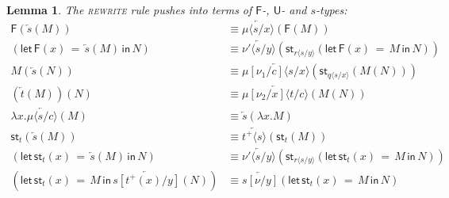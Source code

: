 \documentclass[10pt]{article}
\newtheorem{lemma}{Lemma}
\theoremstyle{definition}
\newcommand{\rewrite}[2]{\overleftarrow{#1}(#2)}
\newcommand\UE[2]{\ensuremath{#1(#2)}}
\newcommand\UI[2]{\ensuremath{\lambda #1.#2}}
\newcommand\StI[2]{\ensuremath{\mathsf{st}_{#1}(#2)}}
\newcommand\StE[4]{\ensuremath{\mathsf{let} \, \StI{#1}{#3} \, = \, {#2} \, \mathsf{in} \, #4}}
\newcommand\FE[3]{\ensuremath{\mathsf{let} \, \mathsf{F}(#2) \, = \, {#1} \, \mathsf{in} \, #3}}
\newcommand\FI[1]{\ensuremath{\mathsf{F}{(#1)}}}
\newcommand\TrPlus[2]{\ensuremath{{#1}^+(#2)}}
\newcommand\ap[2]{\ensuremath{#1 \langle #2 \rangle }}
\newcommand\ApPlus[2]{\ensuremath{{#1}^+ \langle #2 \rangle }}
\begin{document}
\begin{lemma} \label{lem:rewrite-push}
The \textsc{rewrite} rule pushes into terms of $\mathsf{F}$-, $\mathsf{U}$- and $s$-types:
\begin{align*}
\FI{\rewrite{s}{M}} &\equiv \rewrite{\ap{\mu}{s/x}}{\FI{M}} \\
(\FE{\rewrite{s}{M}}{x}{N}) &\equiv \rewrite{\ap{\nu'}{s/y}}{\StI{\ap{r}{s/y}}{\FE{M}{x}{N}}} \\
\UE{M}{\rewrite{s}{N}} &\equiv \rewrite{\ap{\mu[\nu_1/c]}{s/x}}{\StI{\ap{q}{s/x}}{\UE{M}{N}}} \\
\UE{(\rewrite{t}{M})}{N} &\equiv \rewrite{\ap{\mu[\nu_2/x]}{t/c}}{\UE{M}{N}} \\
\UI{x}{\rewrite{\ap{\mu}{s/c}}{M}}  &\equiv\rewrite{s}{\UI{x}{M}} \\
\StI{t}{\rewrite{s}{M}} &\equiv \rewrite{\ApPlus{t}{s}}{\StI{t}{M}} \\
(\StE{t}{\rewrite{s}{M}}{x}{N}) &\equiv \rewrite{\ap{\nu'}{s/y}}{\StI{\ap{r}{s/y}}{\StE{t}{M}{x}{N}}} \\
(\StE{t}{M}{x}{\rewrite{s[\TrPlus{t}{x}/y]}{N}}) &\equiv \rewrite{s[\nu/y]}{\StE{t}{M}{x}{N}} 
\end{align*}
\end{lemma}
\end{document}
